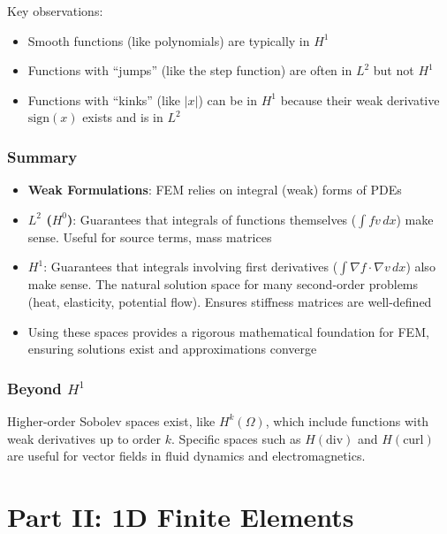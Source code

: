 \documentclass[
  11pt,
  a4paper,
]{scrbook}
\providecommand{\tightlist}{%
  \setlength{\itemsep}{0pt}\setlength{\parskip}{0pt}}\usepackage{longtable,booktabs,array}
\begin{document}
Key observations:

\begin{itemize}
\tightlist
\item
  Smooth functions (like polynomials) are typically in \(H^1\)
\item
  Functions with ``jumps'' (like the step function) are often in \(L^2\)
  but not \(H^1\)
\item
  Functions with ``kinks'' (like \(|x|\)) can be in \(H^1\) because
  their weak derivative \(\text{sign}(x)\) exists and is in \(L^2\)
\end{itemize}

\section{Summary}\label{summary}

\begin{itemize}
\tightlist
\item
  \textbf{Weak Formulations}: FEM relies on integral (weak) forms of
  PDEs
\item
  \textbf{\(L^2\) (\(H^0\))}: Guarantees that integrals of functions
  themselves (\(\int fv\,dx\)) make sense. Useful for source terms, mass
  matrices
\item
  \textbf{\(H^1\)}: Guarantees that integrals involving first
  derivatives (\(\int \nabla f \cdot \nabla v\,dx\)) also make sense.
  The natural solution space for many second-order problems (heat,
  elasticity, potential flow). Ensures stiffness matrices are
  well-defined
\item
  Using these spaces provides a rigorous mathematical foundation for
  FEM, ensuring solutions exist and approximations converge
\end{itemize}

\section{\texorpdfstring{Beyond
\(H^1\)}{Beyond H\^{}1}}\label{beyond-h1}

Higher-order Sobolev spaces exist, like \(H^k(\Omega)\), which include
functions with weak derivatives up to order \(k\). Specific spaces such
as \(H(\text{div})\) and \(H(\text{curl})\) are useful for vector fields
in fluid dynamics and electromagnetics.

\part{Part II: 1D Finite Elements}
\end{document}
